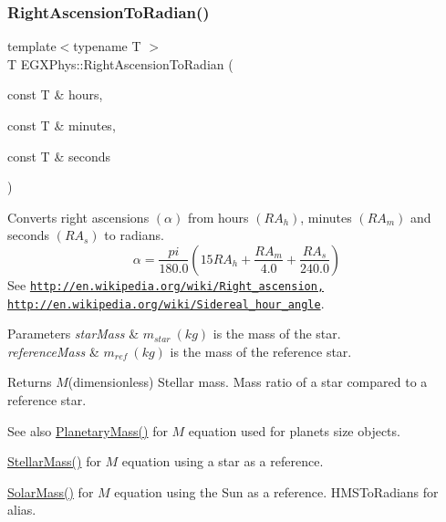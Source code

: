 \subsubsection{\texorpdfstring{Right\+Ascension\+To\+Radian()}{RightAscensionToRadian()}}
{\footnotesize\ttfamily template$<$typename T $>$ \\
T E\+G\+X\+Phys\+::\+Right\+Ascension\+To\+Radian (\begin{DoxyParamCaption}\item[{const T \&}]{hours,  }\item[{const T \&}]{minutes,  }\item[{const T \&}]{seconds }\end{DoxyParamCaption})}



Converts right ascensions $(\alpha)$ from hours $(RA_h)$, minutes $(RA_m)$ and seconds $(RA_s)$ to radians. \[\alpha=\frac{pi}{180.0}(15 RA_h + \frac{RA_m}{4.0} + \frac{RA_s}{240.0})\] See \href{http://en.wikipedia.org/wiki/Right_ascension,}{\tt http\+://en.\+wikipedia.\+org/wiki/\+Right\+\_\+ascension,} \href{http://en.wikipedia.org/wiki/Sidereal_hour_angle}{\tt http\+://en.\+wikipedia.\+org/wiki/\+Sidereal\+\_\+hour\+\_\+angle}. 


\begin{DoxyParams}{Parameters}
{\em star\+Mass} & $m_{star}\ (kg)$ is the mass of the star. \\
\hline
{\em reference\+Mass} & $m_{ref}\ (kg)$ is the mass of the reference star. \\
\hline
\end{DoxyParams}
\begin{DoxyReturn}{Returns}
$M$(dimensionless) Stellar mass. Mass ratio of a star compared to a reference star. 
\end{DoxyReturn}
\begin{DoxySeeAlso}{See also}
\mbox{\hyperlink{group___e_g_x_phys-_planetary_mass_ga225bcf56fb37468f6d4d46493d403503}{Planetary\+Mass()}} for $M$ equation used for planets size objects. 

\mbox{\hyperlink{group___e_g_x_phys-_b_v_color_gabbd6081cd3bfb0153d7470d58f733a61}{Stellar\+Mass()}} for $M$ equation using a star as a reference. 

\mbox{\hyperlink{group___e_g_x_phys-_b_v_color_gac393d64d586be3dc76ac7a98ac336514}{Solar\+Mass()}} for $M$ equation using the Sun as a reference.  H\+M\+S\+To\+Radians for alias. 
\end{DoxySeeAlso}

